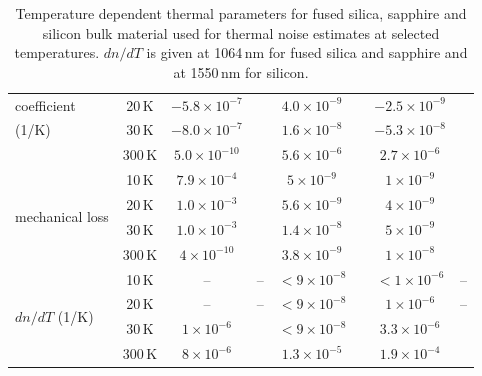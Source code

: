 \begin{table}[!t]
\begin{center}
\begin{tabular}{|l|c|c|c|c|c|c|c|}
coefficient		& 20\,K  & $\mathrm{-5.8\times10^{-7}} $ & \cite{Touloukian1970_alpha_nonmetal} & $\mathrm{4.0\times10^{-9}}$ & \cite{White1994} & $\mathrm{-2.5\times10^{-9}} $ & \cite{Hull1999}  \\ 
(1/K)        	& 30\,K  & $\mathrm{-8.0\times10^{-7}} $ & \cite{Touloukian1970_alpha_nonmetal} & $\mathrm{1.6\times10^{-8}}$ & \cite{White1994} & $\mathrm{-5.3\times10^{-8}} $ & \cite{Hull1999} \\ 							
							& 300\,K & $\mathrm{5.0\times10^{-10}} $ & \cite{Touloukian1970_alpha_nonmetal} & $\mathrm{5.6\times10^{-6}}$ & \cite{White1994} & $\mathrm{2.7\times10^{-6}} $ & \cite{Hull1999} \\ \hline
\multirow{4}{*}{mechanical loss} & 10\,K & $\mathrm{7.9\times10^{-4}} $ & \cite{Schwarz2009} & $\mathrm{5\times10^{-9}}$ & \cite{Uchiyama1999} & $\mathrm{1\times10^{-9}}$ & \cite{McGuigan1978}\\
							& 20\,K & $\mathrm{1.0\times10^{-3}} $ & \cite{Schwarz2009} & $\mathrm{5.6\times10^{-9}}$ & \cite{Uchiyama1999} & $\mathrm{4\times10^{-9}}$ & \cite{Nawrodt2008}\\
 							& 30\,K & $\mathrm{1.0\times10^{-3}} $ & \cite{Schwarz2009} & $\mathrm{1.4\times10^{-8}}$ & \cite{Uchiyama1999} & $\mathrm{5\times10^{-9}}$ & \cite{McGuigan1978}\\							
							& 300\,K & $\mathrm{4\times10^{-10}} $ & \cite{Penn2006} & $\mathrm{3.8\times10^{-9}} $ & \cite{Rowan2000} & $\mathrm{1\times10^{-8}}$ & \cite{Nawrodt2008} \\ \hline
\multirow{4}{*}{$dn/dT$ (1/K)} & 10\,K & -- & -- & $\mathrm{<9\times10^{-8}} $ & \cite{Tomaru2002a} & $\mathit{<1\times10^{-6}} $ & -- \\
							& 20\,K & -- & -- & $\mathrm{<9\times10^{-8}} $ & \cite{Tomaru2002a} & $\mathrm{1\times10^{-6}}$ & -- \\
							& 30\,K & $\mathrm{1\times10^{-6}}$ & \cite{Leviton2006} & $\mathrm{<9\times10^{-8}} $ & \cite{Tomaru2002a} & $\mathrm{3.3\times10^{-6}}$ &\cite{Frey2006}\\									
							& 300\,K & $\mathrm{8\times10^{-6}}$ & \cite{Leviton2006} & $\mathrm{1.3\times10^{-5}}$ & \cite{Malitson1962} & $\mathrm{1.9\times10^{-4}}$& \cite{Frey2006} \\ \hline
\end{tabular}
\end{center}
\caption{Temperature dependent thermal parameters for fused silica, sapphire and silicon bulk material used for thermal noise estimates at selected temperatures. $dn/dT$ is given at 1064\,nm for fused silica and sapphire and at 1550\,nm for silicon.}
\label{tab:tn_T_param}
\end{table}

